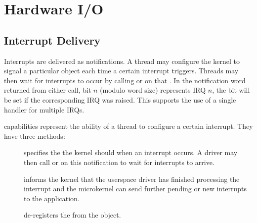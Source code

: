 %
%
%
%

\chapter{\label{ch:io}Hardware I/O}

\section{Interrupt Delivery}
\label{sec:interrupts}

Interrupts are delivered as notifications. A thread
may configure the kernel to signal a particular 
object each time a certain interrupt triggers. Threads may then wait for
interrupts to occur by calling  or
 on
that . In the notification word returned from
either call,  bit $n$  (modulo
word size) represents IRQ $n$, the bit will be set if the
corresponding IRQ was raised. This supports the use of a single handler for
multiple IRQs.

 capabilities represent the ability of a thread to
configure a certain interrupt. They have three methods:

\begin{description}
    \item[]
    specifies the  the kernel should
     when an interrupt occurs. A driver
    may then call  or 
    on this notification to
    wait for interrupts to arrive.

    \item[]
    informs the kernel that the userspace driver has finished processing
    the interrupt and the microkernel can send further pending or new
    interrupts to the application.

    \item[]
    de-registers the  from the  object.
\end{description}

